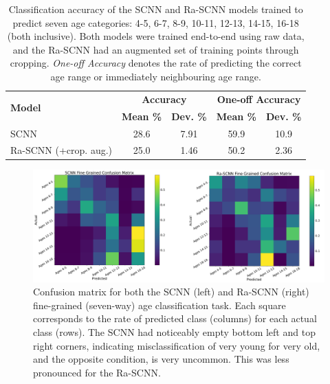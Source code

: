 \documentclass[fleqn,10pt]{wlscirep}
\begin{document}
\begin{table}[h]
 \caption{Classification accuracy of the SCNN and Ra-SCNN models trained to predict seven age categories: 4-5, 6-7, 8-9, 10-11, 12-13, 14-15, 16-18 (both inclusive). Both models were trained end-to-end using raw data, and the Ra-SCNN had an augmented set of training points through cropping. {\em One-off Accuracy} denotes the rate of predicting the correct age range or immediately neighbouring age range.}
 \centering
 \begin{tabular}{l | c | c | c | c}
   \toprule
   \multirow{2}{*}{\textbf{Model}}                 &  \multicolumn{2}{c|}{\textbf{Accuracy}} & \multicolumn{2}{c}{\textbf{One-off Accuracy}} \\
                                                   & \textbf{Mean \%} & \textbf{Dev. \%} & \textbf{Mean \%} & \textbf{Dev. \%} \\
   \toprule
                        SCNN                       &       28.6       &      7.91        &       59.9       &        10.9        \\
   \midrule
                        Ra-SCNN (+crop. aug.)      &       25.0       &       1.46       &      50.2        &        2.36         \\ 
   \bottomrule
 \end{tabular}
 \label{tab:seven_way_results}
\end{table}

\begin{figure}[ht]
  \centering\includegraphics[width=1.0\linewidth]{confusion_matrix.pdf}
   \caption{Confusion matrix for both the SCNN (left) and Ra-SCNN (right) fine-grained (seven-way) age classification task. Each square corresponds to the rate of predicted class (columns) for each actual class (rows). The SCNN had noticeably empty bottom left and top right corners, indicating misclassification of very young for very old, and the opposite condition, is very uncommon. This was less pronounced for the Ra-SCNN.}
 \label{fig:fig_confusion}
\end{figure}
\end{document}
